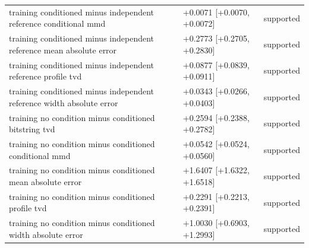 \begin{table}[p]
\begin{tabular}{@{}p{}p{}p{}@{}}
training conditioned minus independent reference conditional mmd & +0.0071 [+0.0070, +0.0072] & supported \\
training conditioned minus independent reference mean absolute error & +0.2773 [+0.2705, +0.2830] & supported \\
training conditioned minus independent reference profile tvd & +0.0877 [+0.0839, +0.0911] & supported \\
training conditioned minus independent reference width absolute error & +0.0343 [+0.0266, +0.0403] & supported \\
training no condition minus conditioned bitstring tvd & +0.2594 [+0.2388, +0.2782] & supported \\
training no condition minus conditioned conditional mmd & +0.0542 [+0.0524, +0.0560] & supported \\
training no condition minus conditioned mean absolute error & +1.6407 [+1.6322, +1.6518] & supported \\
training no condition minus conditioned profile tvd & +0.2291 [+0.2213, +0.2391] & supported \\
training no condition minus conditioned width absolute error & +1.0030 [+0.6903, +1.2993] & supported \\
\bottomrule
\end{tabular}
\end{table}
\clearpage
